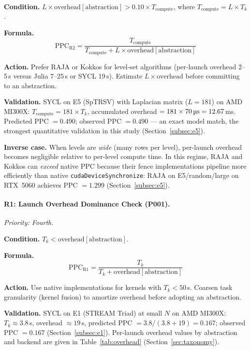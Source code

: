 \noindent\textbf{Condition.}
$L \times \text{overhead}[\text{abstraction}] > 0.10 \times
T_{\text{compute}}$, where
$T_{\text{compute}} = L \times T_k$.

\noindent\textbf{Formula.}
\begin{equation}
    \text{PPC}_{\text{R2}} = \frac{T_{\text{compute}}}
    {T_{\text{compute}} + L \times \text{overhead}[\text{abstraction}]}
    \label{eq:r2}
\end{equation}

\noindent\textbf{Action.}
Prefer RAJA or Kokkos for level-set algorithms (per-launch overhead
2--5\,\textmu{}s versus Julia 7--25\,\textmu{}s or SYCL 19\,\textmu{}s).
Estimate $L \times \text{overhead}$ before committing to an abstraction.

\noindent\textbf{Validation.}
SYCL on E5 (SpTRSV) with Laplacian matrix ($L = 181$) on AMD MI300X:
$T_{\text{compute}} = 181 \times T_k$, accumulated overhead
$= 181 \times 70\,\text{\textmu{}s} = 12.67$\,ms. Predicted PPC $= 0.490$;
observed PPC $= 0.490$ --- an exact model match, the strongest quantitative
validation in this study (Section~\ref{subsec:e5}).

\noindent\textbf{Inverse case.}
When levels are \emph{wide} (many rows per level), per-launch overhead
becomes negligible relative to per-level compute time. In this regime, RAJA
and Kokkos can \emph{exceed} native PPC because their fence implementations
pipeline more efficiently than native \texttt{cudaDeviceSynchronize}:
RAJA on E5/random/large on RTX~5060 achieves PPC $= 1.299$
(Section~\ref{subsec:e5}).

\paragraph{R1: Launch Overhead Dominance Check (P001).}
\textit{Priority: Fourth.}

\noindent\textbf{Condition.}
$T_k < \text{overhead}[\text{abstraction}]$.

\noindent\textbf{Formula.}
\begin{equation}
    \text{PPC}_{\text{R1}} = \frac{T_k}{T_k + \text{overhead}[\text{abstraction}]}
    \label{eq:r1}
\end{equation}

\noindent\textbf{Action.}
Use native implementations for kernels with $T_k < 50$\,\textmu{}s.
Coarsen task granularity (kernel fusion) to amortize overhead before adopting
an abstraction.

\noindent\textbf{Validation.}
SYCL on E1 (STREAM Triad) at small $N$ on AMD MI300X: $T_k \approx
3.8$\,\textmu{}s, overhead $\approx 19$\,\textmu{}s, predicted PPC
$= 3.8 / (3.8 + 19) = 0.167$; observed PPC $= 0.167$
(Section~\ref{subsec:e1}). Per-launch overhead values by abstraction and
backend are given in Table~\ref{tab:overhead} (Section~\ref{sec:taxonomy}).

